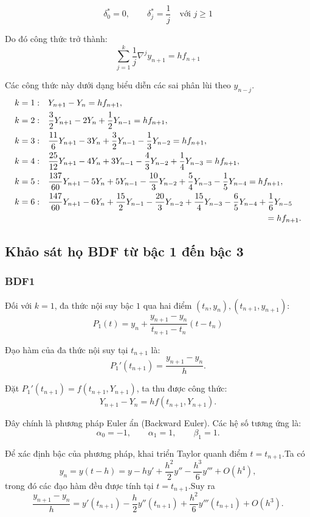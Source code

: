 $$\delta_0^* = 0, \qquad \delta_j^* = \frac{1}{j} \quad \text{với } j \ge 1 $$

Do đó công thức trở thành:
$$\sum_{j=1}^k \frac{1}{j} \nabla^j y_{n+1} = hf_{n+1}$$

Các công thức này dưới dạng biểu diễn các sai phân lùi theo $y_{n-j}$.
\begin{align*}
k=1: \quad & Y_{n+1} - Y_n = hf_{n+1}, \notag \\
k=2: \quad & \frac{3}{2}Y_{n+1} - 2Y_n + \frac{1}{2}Y_{n-1} = hf_{n+1},\\
k=3: \quad & \frac{11}{6}Y_{n+1} - 3Y_n + \frac{3}{2}Y_{n-1} - \frac{1}{3}Y_{n-2} = hf_{n+1}, \notag \\
k=4: \quad & \frac{25}{12}Y_{n+1} - 4Y_n + 3Y_{n-1} - \frac{4}{3}Y_{n-2} + \frac{1}{4}Y_{n-3} = hf_{n+1}, \notag \\
k=5: \quad & \frac{137}{60}Y_{n+1} - 5Y_n + 5Y_{n-1} - \frac{10}{3}Y_{n-2} + \frac{5}{4}Y_{n-3} - \frac{1}{5}Y_{n-4} = hf_{n+1}, \notag \\
k=6: \quad & \frac{147}{60}Y_{n+1} - 6Y_n + \frac{15}{2}Y_{n-1} - \frac{20}{3}Y_{n-2} + \frac{15}{4}Y_{n-3} - \frac{6}{5}Y_{n-4} + \frac{1}{6}Y_{n-5} \notag \\
& \hspace{9cm} = hf_{n+1}. \notag
\end{align*}
 

\subsection{Khảo sát họ BDF từ bậc 1 đến bậc 3}
\subsubsection{BDF1}
Đối với $k=1$, đa thức nội suy bậc $1$ qua hai điểm $(t_n,y_n), (t_{n+1},y_{n+1})$: $$P_1(t) = y_n + \frac{y_{n+1} - y_n}{t_{n+1} - t_n}(t - t_n)$$

Đạo hàm của đa thức nội suy tại $t_{n+1}$ là:
\[
    P_1'(t_{n+1}) = \frac{y_{n+1}-y_n}{h}.
\]

Đặt $P_1'(t_{n+1}) = f(t_{n+1},Y_{n+1})$, ta thu được công thức:
\begin{equation*}
    {Y_{n+1} - Y_n = h f(t_{n+1},Y_{n+1}).}
\end{equation*}

Đây chính là phương pháp Euler ẩn (Backward Euler). Các hệ số tương ứng là:
\[
    \alpha_0 = -1, \qquad \alpha_1 = 1, \qquad \beta_1 = 1.
\]

Để xác định bậc của phương pháp, khai triển Taylor quanh điểm
$t=t_{n+1}$.Ta có
\[
y_n
=
y(t-h)
=
y
-hy'
+\frac{h^2}{2}y''
-\frac{h^3}{6}y'''
+O(h^4),
\]
trong đó các đạo hàm đều được tính tại $t=t_{n+1}$.Suy ra
\[
\frac{y_{n+1}-y_n}{h}
=
y'(t_{n+1})
-\frac{h}{2}y''(t_{n+1})
+\frac{h^2}{6}y'''(t_{n+1})
+O(h^3).
\]

